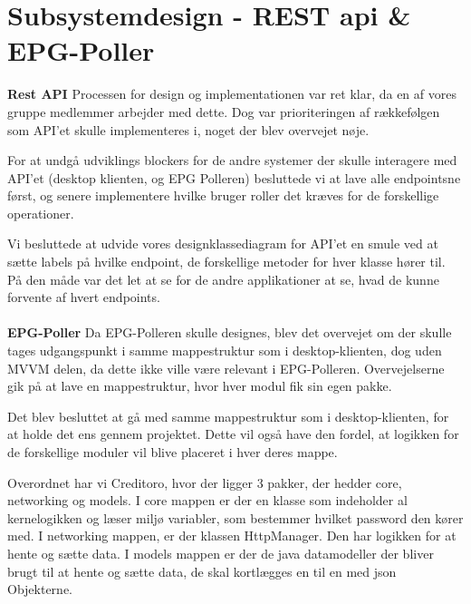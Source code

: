 \section{Subsystemdesign - REST api \& EPG-Poller}\label{api_epg_design}
{\large\textbf{Rest API}}
Processen for design og implementationen var ret klar, da en af vores gruppe medlemmer arbejder med dette. Dog var prioriteringen af rækkefølgen som API'et skulle implementeres i, noget der blev overvejet nøje. 

For at undgå udviklings blockers for de andre systemer der skulle interagere med API'et (desktop klienten, og EPG Polleren) besluttede vi at lave alle endpointsne først, og senere implementere hvilke bruger roller det kræves for de forskellige operationer.

Vi besluttede at udvide vores designklassediagram for API'et en smule ved at sætte labels på hvilke endpoint, de forskellige metoder for hver klasse hører til. På den måde var det let at se for de andre applikationer at se, hvad de kunne forvente af hvert endpoints.\\ \\


{\large\textbf{EPG-Poller}}
Da EPG-Polleren skulle designes, blev det overvejet om der skulle tages udgangspunkt i samme mappestruktur som i desktop-klienten, dog uden MVVM delen, da dette ikke ville være relevant i EPG-Polleren. Overvejelserne gik på at lave en mappestruktur, hvor hver modul fik sin egen pakke.

Det blev besluttet at gå med samme mappestruktur som i desktop-klienten, for at holde det ens gennem projektet. Dette vil også have den fordel, at logikken for de forskellige moduler vil blive placeret i hver deres mappe.

Overordnet har vi Creditoro, hvor der ligger 3 pakker, der hedder core, networking og models.
I core mappen er der en klasse som indeholder al kernelogikken og læser miljø variabler, som bestemmer hvilket password den kører med.
I networking mappen, er der klassen HttpManager. Den har logikken for at hente og sætte data.
I models mappen er der de java datamodeller der bliver brugt til at hente og sætte data, de skal kortlægges en til en med json Objekterne.
